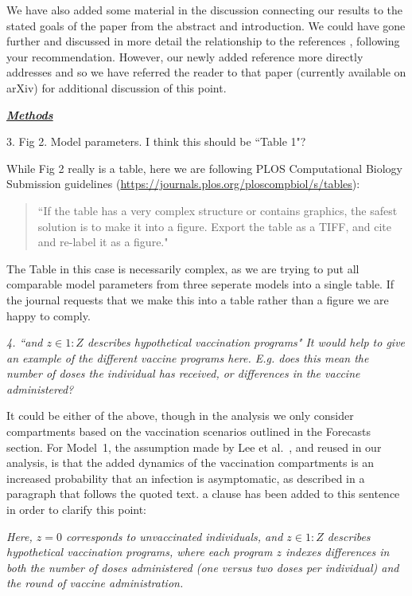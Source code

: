 \documentclass[11pt]{article}
\newcommand\seq[2]{{#1}\!:\!{#2}}
\newcommand\vaccClass{Z}
\newcommand\vaccCounter{z}
\newcommand\report[1]{{\color{mygreen} \vspace{1mm}\hspace{0.25in}\parbox{6in}{\em #1}}}
\newcommand\article[1]{{\color{blue} \vspace{1mm}\hspace{0.25in}\parbox{6in}{\em #1}}}
\begin{document}
We have also added some material in the discussion connecting our results to the stated goals of the paper from the abstract and introduction.
We could have gone further and discussed in more detail the relationship to the references \cite{behrend20,saltelli20}, following your recommendation.
However, our newly added reference \cite{li23} more directly addresses \cite{behrend20,saltelli20} and so we have referred the reader to that paper (currently available on arXiv) for additional discussion of this point.

\report{
  \textbf{\underline{Methods}}

3.  Fig 2. Model parameters. I think this should be ``Table 1"?
}

While Fig 2 really is a table, here we are following PLOS Computational Biology Submission guidelines (\url{https://journals.plos.org/ploscompbiol/s/tables}):
\begin{quote}
``If the table has a very complex structure or contains graphics, the safest solution is to make it into a figure. Export the table as a TIFF, and cite and re-label it as a figure."
\end{quote}
The Table in this case is necessarily complex, as we are trying to put all comparable model parameters from three seperate models into a single table.
If the journal requests that we make this into a table rather than a figure we are happy to comply.

\report{4.
    ``and $z \in 1:Z$ describes hypothetical vaccination programs" It would help to give an example of the different vaccine programs here. E.g. does this mean the number of doses the individual has received, or differences in the vaccine administered?
}

It could be either of the above, though in the analysis we only consider compartments based on the vaccination scenarios outlined in the Forecasts section.
For Model~1, the assumption made by Lee et al.~\cite{lee20}, and reused in our analysis, is that the added dynamics of the vaccination compartments is an increased probability that an infection is asymptomatic, as described in a paragraph that follows the quoted text.
a clause has been added to this sentence in order to clarify this point:

\article{Here, $\vaccCounter=0$ corresponds to unvaccinated individuals, and $\vaccCounter \in \seq{1}{\vaccClass}$ describes hypothetical vaccination programs, where each program $\vaccCounter$ indexes differences in both the number of doses administered (one versus two doses per individual) and the round of vaccine administration.}
\end{document}
